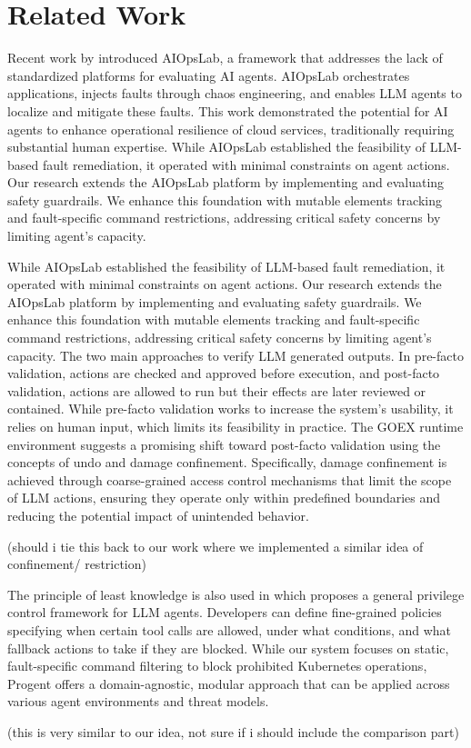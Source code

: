\section{Related Work}
\label{sec:related_work}


Recent work by \cite{shetty2024aiagents} introduced AIOpsLab, a framework that addresses the lack of standardized platforms for evaluating AI agents. AIOpsLab orchestrates applications, injects faults through chaos engineering, and enables LLM agents to localize and mitigate these faults. This work demonstrated the potential for AI agents to enhance operational resilience of cloud services, traditionally requiring substantial human expertise. 
While AIOpsLab established the feasibility of LLM-based fault remediation, it operated with minimal constraints on agent actions. Our research extends the AIOpsLab platform by implementing and evaluating safety guardrails. We enhance this foundation with mutable elements tracking and fault-specific command restrictions, addressing critical safety concerns by limiting agent’s capacity. 

While AIOpsLab established the feasibility of LLM-based fault remediation, it operated with minimal constraints on agent actions. Our research extends the AIOpsLab platform by implementing and evaluating safety guardrails. We enhance this foundation with mutable elements tracking and fault-specific command restrictions, addressing critical safety concerns by limiting agent’s capacity. 
The two main approaches to verify LLM generated outputs. In pre-facto validation, actions are checked and approved before execution, and post-facto validation, actions are allowed to run but their effects are later reviewed or contained.
While pre-facto validation works to increase the system’s usability, it relies on human input, which limits its feasibility in practice. The GOEX runtime environment \cite{patil2024goexperspectivesdesignsruntime} suggests a promising shift toward post-facto validation using the concepts of undo and damage confinement. Specifically, damage confinement is achieved through coarse-grained access control mechanisms that limit the scope of LLM actions, ensuring they operate only within predefined boundaries and reducing the potential impact of unintended behavior.

(should i tie this back to our work where we implemented a similar idea of confinement/ restriction)


The principle of least knowledge is also used in \cite{shi2025progent} which proposes a general privilege control framework for LLM agents. Developers can define fine-grained policies specifying when certain tool calls are allowed, under what conditions, and what fallback actions to take if they are blocked. While our system focuses on static, fault-specific command filtering to block prohibited Kubernetes operations, Progent offers a domain-agnostic, modular approach that can be applied across various agent environments and threat models.

(this is very similar to our idea, not sure if i should include the comparison part)
